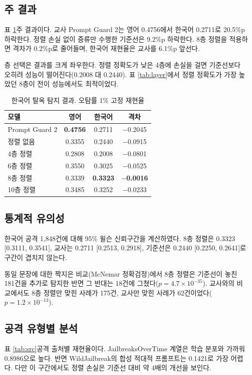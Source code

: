 \documentclass[twocolumn, 10pt]{article}
\begin{document}
\subsection{주 결과}
표 \ref{tab:main}\은 주 결과이다.
교사 Prompt Guard 2는 영어 0.4756에서 한국어 0.2711로 20.5\%p 하락한다.
정렬 손실 없이 증류만 수행한 기준선은 9.2\%p 하락한다.
8층 정렬을 적용하면 격차가 0.2\%p로 줄어들며, 한국어 재현율은 교사를 6.1\%p 앞선다.

층 선택은 결과를 크게 좌우한다.
정렬 정확도가 낮은 4층에 손실을 걸면 기준선보다 오히려 성능이 떨어진다(0.2008 대 0.2440).
표 \ref{tab:layer}에서 정렬 정확도가 가장 높았던 8층이 전이 성능에서도 최적이었다.

\begin{table}[t]
\caption{한국어 탈옥 탐지 결과. 오탐률 1\% 고정 재현율}
\label{tab:main}
\begin{center}
\begin{tabular}{l|c|c|c}
\hline
모델 & 영어 & 한국어 & 격차 \\
\hline
Prompt Guard 2 & \textbf{0.4756} & 0.2711 & $-$0.2045 \\
\hline
정렬 없음 & 0.3355 & 0.2440 & $-$0.0915 \\
4층 정렬 & 0.2808 & 0.2008 & $-$0.0801 \\
6층 정렬 & 0.3550 & 0.3025 & $-$0.0525 \\
8층 정렬 & 0.3339 & \textbf{0.3323} & \textbf{$-$0.0016} \\
10층 정렬 & 0.3485 & 0.3252 & $-$0.0233 \\
\hline
\end{tabular}
\end{center}
\end{table}

\subsection{통계적 유의성}
한국어 공격 1{,}848건에 대해 95\% 윌슨 신뢰구간을 계산하였다.
8층 정렬은 0.3323 [0.3111, 0.3541], 교사는 0.2711 [0.2513, 0.2918], 기준선은 0.2440 [0.2250, 0.2641]로 구간이 겹치지 않는다.

동일 문장에 대한 짝지은 비교(McNemar 정확검정)에서 8층 정렬은 기준선이 놓친 181건을 추가로 탐지한 반면 그 반대는 18건에 그쳤다($p=4.7\times10^{-35}$).
교사와의 비교에서도 8층 정렬만 맞힌 사례가 175건, 교사만 맞힌 사례가 62건이었다($p=1.2\times10^{-13}$).

\subsection{공격 유형별 분석}
표 \ref{tab:src}\은 공격 출처별 재현율이다.
JailbreaksOverTime 계열은 학습 분포와 가까워 0.8986으로 높다.
반면 WildJailbreak의 합성 적대적 프롬프트는 0.1421로 가장 어렵다.
다만 이 구간에서도 정렬 손실은 기준선 대비 약 4배의 개선을 보인다.
\end{document}
